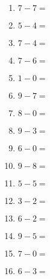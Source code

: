 \documentclass{article}
\begin{document}
\begin{multicols}{4}
\begin{enumerate}
\item $7 - 7 =$
\item $5 - 4 =$
\item $7 - 4 =$
\item $7 - 6 =$
\item $1 - 0 =$
\item $9 - 7 =$
\item $8 - 0 =$
\item $9 - 3 =$
\item $6 - 0 =$
\item $9 - 8 =$
\item $5 - 5 =$
\item $3 - 2 =$
\item $6 - 2 =$
\item $9 - 5 =$
\item $7 - 0 =$
\item $6 - 3 =$

\end{enumerate}
\end{multicols}
\thispagestyle{empty}
\end{document}
